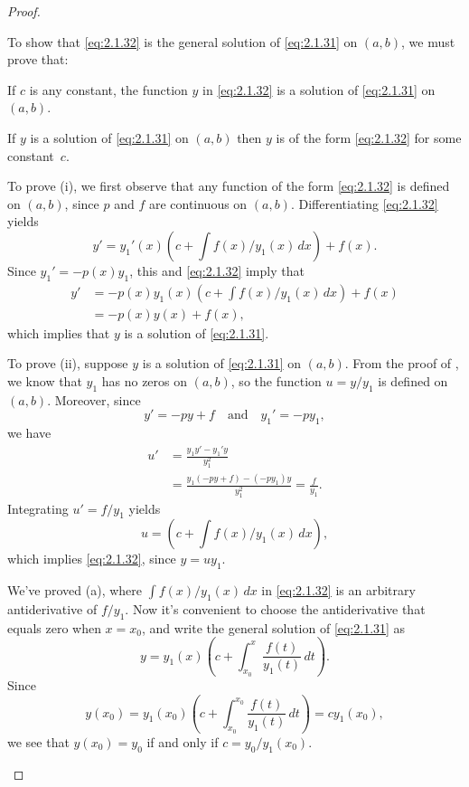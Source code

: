 \begin{proof}
\begin{alist}
\item To show that \eqref{eq:2.1.32} is the general solution of
\eqref{eq:2.1.31} on $(a,b)$, we must prove that:

\begin{rmlist}
\item %
If $c$ is any constant,   the function $y$ in
\eqref{eq:2.1.32} is a solution of \eqref{eq:2.1.31} on  $(a,b)$.
\item %
  If $y$ is a solution of \eqref{eq:2.1.31} on  $(a,b)$ then $y$
is of the form  \eqref{eq:2.1.32} for some constant~$c$.
\end{rmlist}

To prove (i), we first observe that any function of the form
\eqref{eq:2.1.32} is defined on $(a,b)$, since $p$ and $f$ are continuous
on $(a,b)$. Differentiating \eqref{eq:2.1.32} yields
\[
y'=y_1'(x)\left(c +\int f(x)/y_1(x)\,
dx\right)+f(x).
\]
Since $y_1'=-p(x)y_1$, this and \eqref{eq:2.1.32} imply that
\begin{align*}
y'&=-p(x)y_1(x)\left(c +\int f(x)/y_1(x)\, dx\right)+f(x)\\
&=-p(x)y(x)+f(x),
\end{align*}
which implies that $y$ is a solution of \eqref{eq:2.1.31}.

To prove (ii), suppose $y$ is a solution of \eqref{eq:2.1.31}
on $(a,b)$. From the proof of , we know that
$y_1$ has no zeros on $(a,b)$, so the function $u=y/y_1$ is defined
on $(a,b)$. Moreover, since
\[
y'=-py+f\quad\text{and}\quad y_1'=-py_1,
\]
we have
\begin{align*}
u'&=\frac{y_1y'-y_1'y}{y_1^2}\\
&=\frac{y_1(-py+f)-(-py_1)y}{y_1^2}=\frac{f}{y_1}.
\end{align*}
Integrating $u'=f/y_1$ yields
\[
u=\left(c +\int f(x)/y_1(x)\, dx\right),
\]
which implies \eqref{eq:2.1.32}, since $y=uy_1$.

\item We've proved (a), where $\int f(x)/y_1(x)\,dx$ in
\eqref{eq:2.1.32}
is an arbitrary antiderivative of $f/y_1$. Now it's convenient to
choose the antiderivative that equals zero when $x=x_0$, and write the
general solution of \eqref{eq:2.1.31} as
\[
y=y_1(x)\left(c +\int^x_{x_0} \frac{f(t)}{y_1(t)}\, dt\right).
\]
Since
\[
y(x_0)= y_1(x_0)\left(c +\int^{x_0}_{x_0} \frac{f(t)}{y_1(t)}\, dt\right)=cy_1(x_0),
\]
we see that $y(x_0)=y_0$ if and only if $c=y_0/y_1(x_0)$.\qedhere
\end{alist}
\end{proof}

